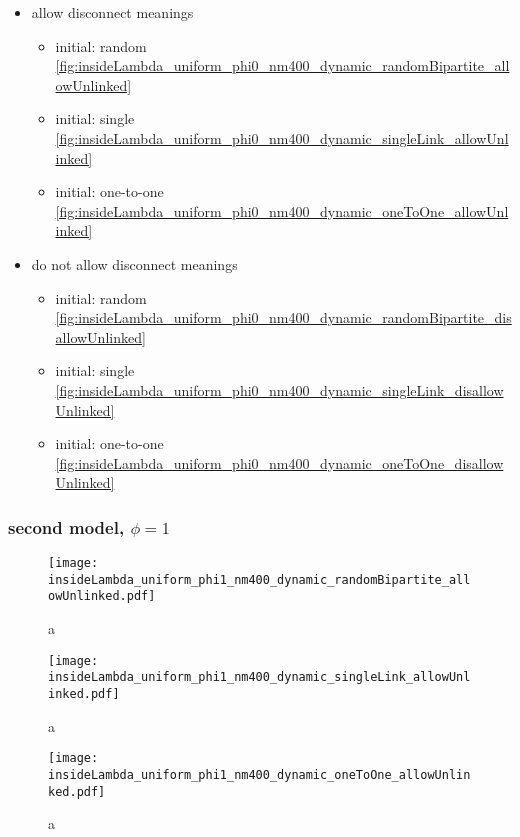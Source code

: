 \begin{itemize}
\item allow disconnect meanings
  \begin{itemize}
  \item initial: random \ref{fig:insideLambda_uniform_phi0_nm400_dynamic_randomBipartite_allowUnlinked}
  \item initial: single \ref{fig:insideLambda_uniform_phi0_nm400_dynamic_singleLink_allowUnlinked}
  \item initial: one-to-one \ref{fig:insideLambda_uniform_phi0_nm400_dynamic_oneToOne_allowUnlinked}
  \end{itemize}
\item do not allow disconnect meanings
  \begin{itemize}
  \item initial: random \ref{fig:insideLambda_uniform_phi0_nm400_dynamic_randomBipartite_disallowUnlinked}
  \item initial: single \ref{fig:insideLambda_uniform_phi0_nm400_dynamic_singleLink_disallowUnlinked}
  \item initial: one-to-one \ref{fig:insideLambda_uniform_phi0_nm400_dynamic_oneToOne_disallowUnlinked}
  \end{itemize}
\end{itemize}

\subsubsection{second model, $\phi=1$}

\begin{figure}
  \centering
  \texttt{[image: insideLambda\_uniform\_phi1\_nm400\_dynamic\_randomBipartite\_allowUnlinked.pdf]}
  \caption{a}
  \label{fig:insideLambda_uniform_phi1_nm400_dynamic_randomBipartite_allowUnlinked}
\end{figure}

\begin{figure}
  \centering
  \texttt{[image: insideLambda\_uniform\_phi1\_nm400\_dynamic\_singleLink\_allowUnlinked.pdf]}
  \caption{a}
  \label{fig:insideLambda_uniform_phi1_nm400_dynamic_singleLink_allowUnlinked}
\end{figure}

\begin{figure}
  \centering
  \texttt{[image: insideLambda\_uniform\_phi1\_nm400\_dynamic\_oneToOne\_allowUnlinked.pdf]}
  \caption{a}
  \label{fig:insideLambda_uniform_phi1_nm400_dynamic_oneToOne_allowUnlinked}
\end{figure}


